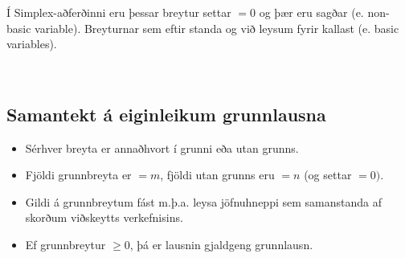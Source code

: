 Í Simplex-aðferðinni eru þessar breytur settar $=0$ og þær eru sagðar  (e. non-basic variable).
Breyturnar sem eftir standa og við leysum fyrir kallast  (e. basic variables).
\begin{verbatim}
 
\end{verbatim}

\subsection*{Samantekt á eiginleikum grunnlausna}
\begin{itemize}
 \item Sérhver breyta er annaðhvort í grunni eða utan grunns.
 \item Fjöldi grunnbreyta er $=m$, fjöldi utan grunns eru $=n$ (og settar $=0)$.
 \item Gildi á grunnbreytum fást m.þ.a. leysa jöfnuhneppi sem samanstanda af skorðum viðskeytts verkefnisins.
 \item Ef grunnbreytur $\geq0$, þá er lausnin gjaldgeng grunnlausn.
\end{itemize}


